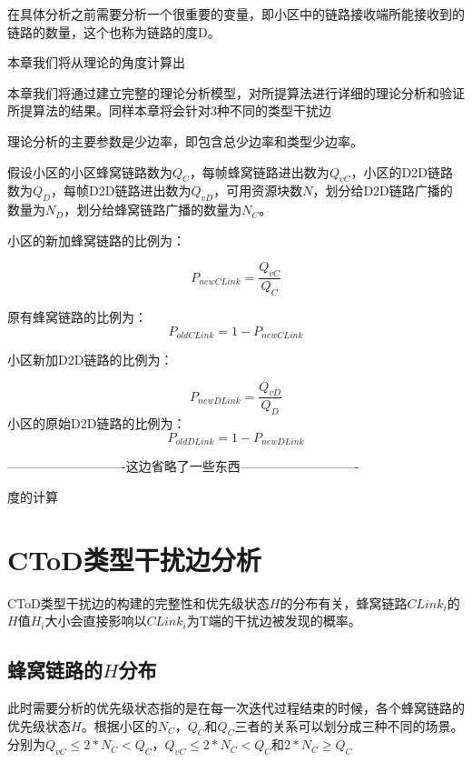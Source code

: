 \documentclass[figurelist,tablelist,algorithmlist,nomlist,masters]{seuthesix}
\begin{document}
	在具体分析之前需要分析一个很重要的变量，即小区中的链路接收端所能接收到的链路的数量，这个也称为链路的度D。


	本章我们将从理论的角度计算出

	本章我们将通过建立完整的理论分析模型，对所提算法进行详细的理论分析和验证所提算法的结果。同样本章将会针对3种不同的类型干扰边

	理论分析的主要参数是少边率，即包含总少边率和类型少边率。

	假设小区的小区蜂窝链路数为$Q_C$，每帧蜂窝链路进出数为$Q_{vC}$，小区的D2D链路数为$Q_D$，每帧D2D链路进出数为$Q_{vD}$，可用资源块数$N$，划分给D2D链路广播的数量为$N_D$，划分给蜂窝链路广播的数量为$N_C$。



	小区的新加蜂窝链路的比例为：

	\begin{equation}\label{eq3.1}
	{P_{newCLink}} = \frac{{Q_{vC}}}{{Q_C}}
	\end{equation}

	原有蜂窝链路的比例为：
	\begin{equation}\label{eq3.2}
	{P_{oldCLink}} = 1 - {P_{newCLink}}
	\end{equation}

	小区新加D2D链路的比例为：

	\begin{equation}\label{eq3.3}
	{P_{newDLink}} = \frac{{Q_{vD}}}{{Q_D}}
	\end{equation}
	小区的原始D2D链路的比例为：
	\begin{equation}\label{eq3.4}
	{P_{oldDLink}} = 1 - {P_{newDLink}}
	\end{equation}

	----------------------------这边省略了一些东西----------------------------

	度的计算

	\section{CToD类型干扰边分析}
	CToD类型干扰边的构建的完整性和优先级状态${H}$的分布有关，蜂窝链路${CLink_i}$的${H}$值${H_i}$大小会直接影响以${CLink_i}$为T端的干扰边被发现的概率。

	\subsection{蜂窝链路的${H}$分布}
	此时需要分析的优先级状态指的是在每一次迭代过程结束的时候，各个蜂窝链路的优先级状态${H}$。根据小区的$N_C$，$Q_C$和$Q_C$三者的关系可以划分成三种不同的场景。分别为$Q_{vC} \le 2*N_C < Q_C$，$Q_{vC} \le 2*N_C < Q_C$和$2*N_C \ge Q_C$
\end{document}
